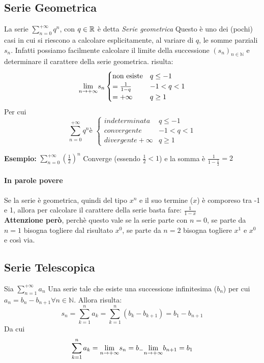 \documentclass[12pt, a4paper, openany]{book}
\newcommand{\esempio}[1]{\begin{box_esempio} \textbf{Esempio: }#1\end{box_esempio}}
\begin{document}
\subsection{Serie Geometrica}
La serie $\sum_{n=0}^{+\infty} q^n$, con $q \in \mathbb{R}$ è detta \emph{Serie geometrica}
Questo è uno dei (pochi) casi in cui si riescono a calcolare esplicitamente, al variare di $q$, le somme parziali $s_n$.
Infatti possiamo facilmente calcolare il limite della successione $(s_n)_{n\in \mathbb{N}}$ e determinare il carattere della serie geometrica. 
risulta:
\begin{equation}
    \underset{n \to +\infty}{\lim} s_n \begin{cases}
        \text{non esiste} & q \leq -1 \\
        = \frac{1}{1-q} & -1 < q < 1 \\
        = +\infty & q \geq 1
    \end{cases}
\end{equation}
Per cui 
\begin{equation}
    \sum_{n=0}^{+\infty} q^n \text{è } \begin{cases}
        indeterminata & q \leq -1 \\
        convergente & -1 < q < 1 \\
        divergente +\infty & q \geq 1
    \end{cases}
\end{equation}

\esempio{
    $\sum_{n=0}^{+\infty} (\frac{1}{2})^n$ Converge (essendo $\frac{1}{2} < 1$) e la somma è $\frac{1}{1-\frac{1}{2}} = 2$ 
}

\paragraph{In parole povere}
Se la serie è geometrica, quindi del tipo $x^n$ e il suo termine ($x$) è comporeso tra -1 e 1, allora per calcolare il carattere della serie basta fare: $\frac{1}{1-x}$
\\ \textbf{Attenzione però}, perchè questo vale se la serie parte con $n=0$, se parte da $n=1$ bisogna togliere dal risultato $x^0$, se parte da $n=2$ bisogna togliere $x^1$ e $x^0$ e così via.

\subsection{Serie Telescopica}
Sia $\sum_{n=1}^{+\infty} a_n$ Una serie tale che esiste una successione infinitesima ($b_n$) per cui $a_n = b_n - b_{n+1} \forall n\in \mathbb{N}$.
Allora risulta:
\begin{equation*}
    s_n = \sum_{k=1}^{n}a_k = \sum_{k=1}^n (b_k - b_{k+1}) = b_1 - b_{n+1}
\end{equation*}
Da cui
\begin{equation*}
    \sum_{k=1}^{n}a_k = \underset{n \to +\infty}{\lim} s_n = b_ - \underset{n \to +\infty}{\lim} b_{n+1} = b_1
\end{equation*}
\end{document}
